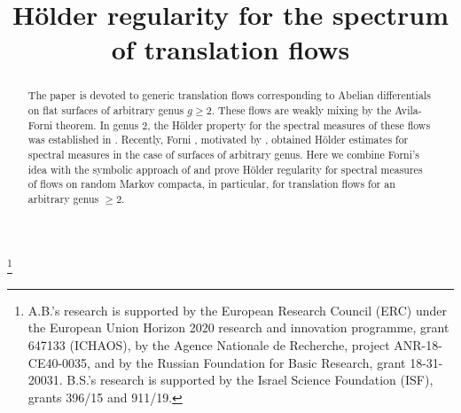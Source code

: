 \documentclass[JEP,XML,SOM,Unicode]{cedram}
\theoremstyle{plain}
\theoremstyle{definition}
\begin{document}
\frontmatter
\title{Hölder regularity for the spectrum of translation flows}

\author[\initial{A.} \middlename {I.} \lastname{Bufetov}]{  }
\address{Aix-Marseille Université, CNRS, Centrale Marseille, I2M, UMR 7373,\\
39 rue F. Joliot Curie, Marseille, France\\
Steklov Mathematical Institute of RAS, Moscow, Russia\\
Institute for Information Transmission Problems, Moscow, Russia}

\author[\initial{B.} \lastname{Solomyak}]{ }
\address{Department of Mathematics, Bar-Ilan University\\
Ramat-Gan, Israel}

\thanks{A.B.'s research is supported by the European Research Council (ERC) under the European Union Horizon 2020 research and innovation programme, grant 647133 (ICHAOS), by the Agence Nationale de Recherche,
project ANR-18-CE40-0035, and by the Russian Foundation for Basic Research, grant 18-31-20031. B.S.'s research is supported by the Israel Science Foundation (ISF), grants 396/15 and 911/19.}

\begin{abstract}
The paper is devoted to generic translation flows corresponding to Abelian differentials on flat surfaces of arbitrary genus $g\ge 2$. These flows are weakly mixing by the Avila-Forni theorem. In genus $2$, the Hölder property for the spectral measures of these flows was established in . Recently, Forni , motivated by , obtained Hölder estimates for spectral measures in the case of surfaces of arbitrary genus. Here we combine Forni's idea with the symbolic approach of  and prove Hölder regularity for spectral measures of flows on random Markov compacta, in particular, for translation flows for an arbitrary genus $\ge 2$.
\end{abstract}


\end{document}
